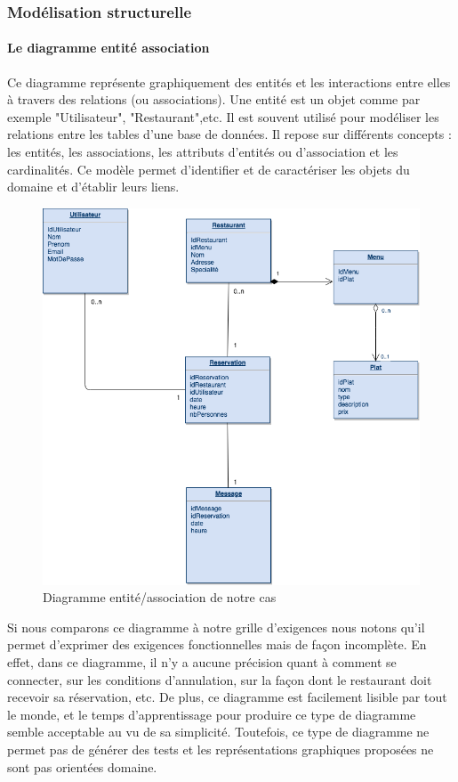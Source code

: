         \subsubsection{Modélisation structurelle}
        
            \paragraph{Le diagramme entité association}
            Ce diagramme représente graphiquement des entités et les interactions entre elles à travers des relations (ou associations). Une entité est un objet comme par exemple "Utilisateur", "Restaurant",etc. Il est souvent utilisé pour modéliser les relations entre les tables d'une base de données. Il repose sur différents concepts : les entités, les associations, les attributs d'entités ou d'association et les cardinalités. Ce modèle permet d'identifier et de caractériser les objets du domaine et d'établir leurs liens.
            \begin{figure}[H]
                \centering
                \includegraphics[width=\textwidth]{images/e_r (1).png}
                \caption{Diagramme entité/association de notre cas}
            \end{figure}
            Si nous comparons ce diagramme à notre grille d'exigences nous notons qu'il permet d'exprimer des exigences fonctionnelles mais de façon incomplète. En effet, dans ce diagramme, il n'y a aucune précision quant à comment se connecter, sur les conditions d'annulation, sur la façon dont le restaurant doit recevoir sa réservation, etc. De plus, ce diagramme est facilement lisible par tout le monde, et le temps d'apprentissage pour produire ce type de diagramme semble acceptable au vu de sa simplicité. Toutefois, ce type de diagramme ne permet pas de générer des tests et les représentations graphiques proposées ne sont pas orientées domaine. 

